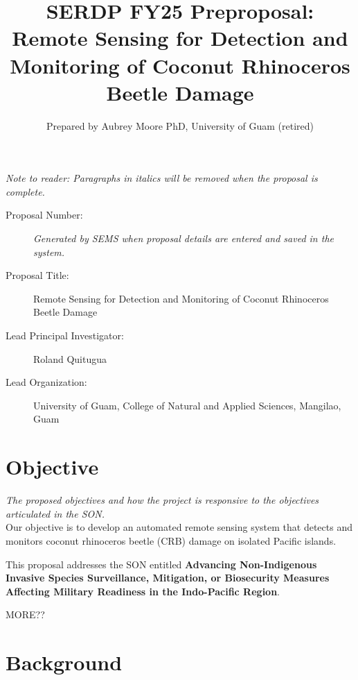 \documentclass[11pt,english,letterpaper]{scrartcl}
\begin{document}
\title{SERDP FY25 Preproposal: Remote Sensing for Detection and Monitoring of Coconut Rhinoceros Beetle Damage}
\author{Prepared by Aubrey Moore PhD, University of Guam (retired)}

\maketitle

\tableofcontents{}\clearpage{}

\textit{Note to reader: Paragraphs in italics will be removed when the proposal is complete.}

\begin{description}
	
\item[Proposal Number:] \emph{Generated by SEMS when proposal details are entered and saved in the system.}

\item[Proposal Title:] Remote Sensing for Detection and Monitoring of Coconut Rhinoceros Beetle Damage

\item[Lead Principal Investigator:] Roland Quitugua

\item[Lead Organization:] University of Guam, College of Natural and Applied Sciences, Mangilao, Guam

\end{description}

\section{Objective}

\textit{The proposed objectives and how the project is responsive to the objectives
	articulated in the SON.}\\

Our objective is to develop an automated remote sensing system that detects and monitors coconut rhinoceros beetle (CRB) damage on isolated Pacific islands. 

This proposal addresses the SON entitled \textbf{Advancing Non-Indigenous Invasive Species Surveillance, Mitigation, or Biosecurity Measures Affecting Military Readiness in the Indo-Pacific Region}.

MORE??

\section{Background}
\end{document}
